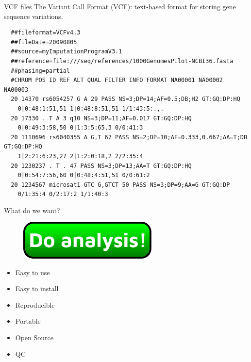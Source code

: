 \documentclass[usepdftitle=false]{beamer}
\begin{document}
\begin{frame}[fragile]{VCF files}
	The Variant Call Format (VCF): text-based format for storing gene sequence variations.
	\pause

	\begin{verbatim}
  ##fileformat=VCFv4.3
  ##fileDate=20090805
  ##source=myImputationProgramV3.1
  ##reference=file:///seq/references/1000GenomesPilot-NCBI36.fasta
  ##phasing=partial
  #CHROM POS ID REF ALT QUAL FILTER INFO FORMAT NA00001 NA00002 NA00003
  20 14370 rs6054257 G A 29 PASS NS=3;DP=14;AF=0.5;DB;H2 GT:GQ:DP:HQ
    0|0:48:1:51,51 1|0:48:8:51,51 1/1:43:5:.,.
  20 17330 . T A 3 q10 NS=3;DP=11;AF=0.017 GT:GQ:DP:HQ
    0|0:49:3:58,50 0|1:3:5:65,3 0/0:41:3
  20 1110696 rs6040355 A G,T 67 PASS NS=2;DP=10;AF=0.333,0.667;AA=T;DB GT:GQ:DP:HQ
    1|2:21:6:23,27 2|1:2:0:18,2 2/2:35:4
  20 1230237 . T . 47 PASS NS=3;DP=13;AA=T GT:GQ:DP:HQ
    0|0:54:7:56,60 0|0:48:4:51,51 0/0:61:2
  20 1234567 microsat1 GTC G,GTCT 50 PASS NS=3;DP=9;AA=G GT:GQ:DP
    0/1:35:4 0/2:17:2 1/1:40:3
	\end{verbatim}
\end{frame}

\begin{frame}{What do we want?}
	\begin{figure}
		\includegraphics[height=2cm]{pictures/doanalysis}
	\end{figure}
	\pause
	\begin{itemize}
		\item Easy to use
		\pause
		\item Easy to install
		\pause
		\item Reproducible
		\pause
		\item Portable
		\pause
		\item Open Source
		\pause
		\item QC
	\end{itemize}
\end{frame}
\end{document}
